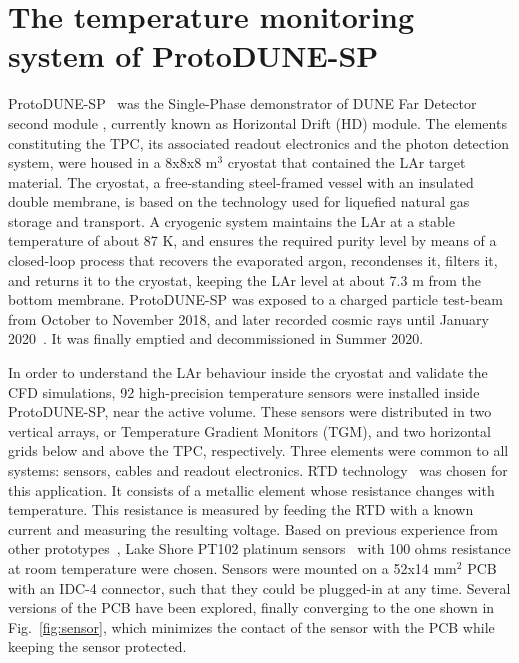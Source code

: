 \section{The temperature monitoring system of ProtoDUNE-SP}
\label{sec:protoDUNE}

\noindent ProtoDUNE-SP~\cite{pdsp_tdr} was the Single-Phase demonstrator of DUNE Far Detector second module \cite{dune_tdr4}, currently known as Horizontal Drift (HD) module. %
The elements constituting the TPC, its associated readout electronics and the photon detection system, were housed in a 8x8x8 m$^3$ cryostat that contained the LAr target material. The cryostat, a free-standing steel-framed vessel with an insulated double membrane, is based on the technology used for liquefied natural gas storage and transport. A cryogenic system maintains the LAr at a stable temperature of about 87 K, and ensures the required purity level by means of a closed-loop process that recovers the evaporated argon, recondenses it, filters it, and returns it to the cryostat, keeping the LAr level at about 7.3 m from the bottom membrane. ProtoDUNE-SP was exposed to a charged particle test-beam from October to November 2018, and later recorded cosmic rays until January 2020~\cite{pdsp_1,pdsp_2}. It was finally emptied and decommissioned in Summer 2020.

In order to understand the LAr behaviour inside the cryostat and validate the CFD simulations, 92 high-precision temperature sensors were installed inside ProtoDUNE-SP, near the active volume. These sensors were distributed in two vertical arrays, or Temperature Gradient Monitors (TGM), and two horizontal grids below and above the TPC, respectively. Three elements were common to all systems: sensors, cables and readout electronics. RTD technology~\cite{minco} was chosen for this application. It consists of a metallic element whose resistance changes with temperature. This resistance is measured by feeding the RTD with a known current and measuring the resulting voltage. Based on previous experience from other prototypes~\cite{35t_1}, Lake Shore PT102 platinum sensors~\cite{pt102} with 100 ohms resistance at room temperature were chosen. Sensors were mounted on a 52x14 mm$^2$ PCB with an IDC-4 connector, such that they could be plugged-in at any time. Several versions of the PCB have been explored, finally converging to the one shown in Fig.~\ref{fig:sensor}, which minimizes the contact of the sensor with the PCB while keeping the sensor protected. 

